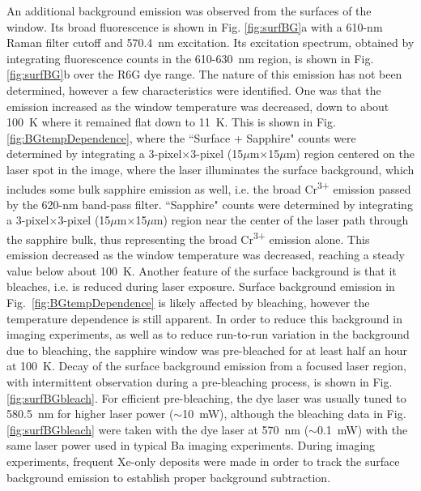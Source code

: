 An additional background emission was observed from the surfaces of the window.  Its broad fluorescence is shown in Fig. \ref{fig:surfBG}a with a 610-nm Raman filter cutoff and 570.4~nm excitation.  Its excitation spectrum, obtained by integrating fluorescence counts in the 610-630~nm region, is shown in Fig. \ref{fig:surfBG}b over the R6G dye range.  The nature of this emission has not been determined, however a few characteristics were identified.  One was that the emission increased as the window temperature was decreased, down to about 100~K where it remained flat down to 11~K.  This is shown in Fig. \ref{fig:BGtempDependence}, where the ``Surface + Sapphire" counts were determined by integrating a 3-pixel$\times$3-pixel (15$\mu$m$\times$15$\mu$m) region centered on the laser spot in the image, where the laser illuminates the surface background, which includes some bulk sapphire emission as well, i.e. the broad Cr\textsuperscript{3+} emission passed by the 620-nm band-pass filter.  ``Sapphire" counts were determined by integrating a 3-pixel$\times$3-pixel (15$\mu$m$\times$15$\mu$m) region near the center of the laser path through the sapphire bulk, thus representing the broad Cr\textsuperscript{3+} emission alone.  This emission decreased as the window temperature was decreased, reaching a steady value below about 100~K.  Another feature of the surface background is that it bleaches, i.e. is reduced during laser exposure.  Surface background emission in Fig.~\ref{fig:BGtempDependence} is likely affected by bleaching, however the temperature dependence is still apparent.  In order to reduce this background in imaging experiments, as well as to reduce run-to-run variation in the background due to bleaching, the sapphire window was pre-bleached for at least half an hour at 100~K.  Decay of the surface background emission from a focused laser region, with intermittent observation during a pre-bleaching process, is shown in Fig. \ref{fig:surfBGbleach}.  For efficient pre-bleaching, the dye laser was usually tuned to 580.5~nm for higher laser power ($\sim$10~mW), although the bleaching data in Fig. \ref{fig:surfBGbleach} were taken with the dye laser at 570~nm ($\sim$0.1~mW) with the same laser power used in typical Ba imaging experiments.  During imaging experiments, frequent Xe-only deposits were made in order to track the surface background emission to establish proper background subtraction.


